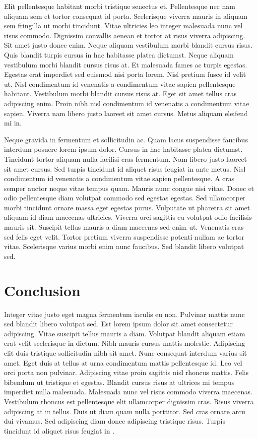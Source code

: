 Elit pellentesque habitant morbi tristique senectus et. Pellentesque nec
nam aliquam sem et tortor consequat id porta. Scelerisque viverra mauris
in aliquam sem fringilla ut morbi tincidunt. Vitae ultricies leo integer
malesuada nunc vel risus commodo. Dignissim convallis aenean et tortor
at risus viverra adipiscing. Sit amet justo donec enim. Neque aliquam
vestibulum morbi blandit cursus risus. Quis blandit turpis cursus in hac
habitasse platea dictumst. Neque aliquam vestibulum morbi blandit cursus
risus at. Et malesuada fames ac turpis egestas. Egestas erat imperdiet
sed euismod nisi porta lorem. Nisl pretium fusce id velit ut. Nisl
condimentum id venenatis a condimentum vitae sapien pellentesque
habitant. Vestibulum morbi blandit cursus risus at. Eget sit amet tellus
cras adipiscing enim. Proin nibh nisl condimentum id venenatis a
condimentum vitae sapien. Viverra nam libero justo laoreet sit amet
cursus. Metus aliquam eleifend mi in.

Neque gravida in fermentum et sollicitudin ac. Quam lacus suspendisse
faucibus interdum posuere lorem ipsum dolor. Cursus in hac habitasse
platea dictumst. Tincidunt tortor aliquam nulla facilisi cras fermentum.
Nam libero justo laoreet sit amet cursus. Sed turpis tincidunt id
aliquet risus feugiat in ante metus. Nisl condimentum id venenatis a
condimentum vitae sapien pellentesque. A cras semper auctor neque vitae
tempus quam. Mauris nunc congue nisi vitae. Donec et odio pellentesque
diam volutpat commodo sed egestas egestas. Sed ullamcorper morbi
tincidunt ornare massa eget egestas purus. Vulputate ut pharetra sit
amet aliquam id diam maecenas ultricies. Viverra orci sagittis eu
volutpat odio facilisis mauris sit. Suscipit tellus mauris a diam
maecenas sed enim ut. Venenatis cras sed felis eget velit. Tortor
pretium viverra suspendisse potenti nullam ac tortor vitae. Scelerisque
varius morbi enim nunc faucibus. Sed blandit libero volutpat sed.

\hypertarget{conclusion}{%
\section{Conclusion}\label{conclusion}}

Integer vitae justo eget magna fermentum iaculis eu non. Pulvinar mattis
nunc sed blandit libero volutpat sed. Est lorem ipsum dolor sit amet
consectetur adipiscing. Vitae suscipit tellus mauris a diam. Volutpat
blandit aliquam etiam erat velit scelerisque in dictum. Nibh mauris
cursus mattis molestie. Adipiscing elit duis tristique sollicitudin nibh
sit amet. Nunc consequat interdum varius sit amet. Eget duis at tellus
at urna condimentum mattis pellentesque id. Leo vel orci porta non
pulvinar. Adipiscing vitae proin sagittis nisl rhoncus mattis. Felis
bibendum ut tristique et egestas. Blandit cursus risus at ultrices mi
tempus imperdiet nulla malesuada. Malesuada nunc vel risus commodo
viverra maecenas. Vestibulum rhoncus est pellentesque elit ullamcorper
dignissim cras. Risus viverra adipiscing at in tellus. Duis ut diam quam
nulla porttitor. Sed cras ornare arcu dui vivamus. Sed adipiscing diam
donec adipiscing tristique risus. Turpis tincidunt id aliquet risus
feugiat in .
